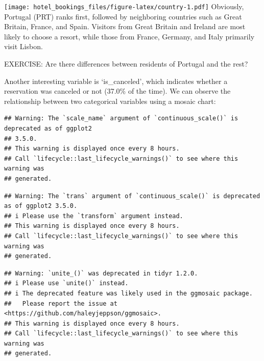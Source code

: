 \documentclass[
]{article}
\newenvironment{Shaded}{\begin{snugshade}}{\end{snugshade}}
\newcommand{\AttributeTok}[1]{\textcolor[rgb]{0.13,0.29,0.53}{#1}}
\newcommand{\CommentTok}[1]{\textcolor[rgb]{0.56,0.35,0.01}{\textit{#1}}}
\newcommand{\FunctionTok}[1]{\textcolor[rgb]{0.13,0.29,0.53}{\textbf{#1}}}
\newcommand{\NormalTok}[1]{#1}
\newcommand{\OtherTok}[1]{\textcolor[rgb]{0.56,0.35,0.01}{#1}}
\newcommand{\SpecialCharTok}[1]{\textcolor[rgb]{0.81,0.36,0.00}{\textbf{#1}}}
\begin{document}
\texttt{[image: hotel\_bookings\_files/figure-latex/country-1.pdf]}
Obviously, Portugal (PRT) ranks first, followed by neighboring countries
such as Great Britain, France, and Spain. Visitors from Great Britain
and Ireland are most likely to choose a resort, while those from France,
Germany, and Italy primarily visit Lisbon.

EXERCISE: Are there differences between residents of Portugal and the
rest?

Another interesting variable is `is\_canceled', which indicates whether
a reservation was canceled or not (37.0\% of the time). We can observe
the relationship between two categorical variables using a mosaic chart:

\begin{Shaded}
\end{Shaded}

\begin{verbatim}
## Warning: The `scale_name` argument of `continuous_scale()` is deprecated as of ggplot2
## 3.5.0.
## This warning is displayed once every 8 hours.
## Call `lifecycle::last_lifecycle_warnings()` to see where this warning was
## generated.
\end{verbatim}

\begin{verbatim}
## Warning: The `trans` argument of `continuous_scale()` is deprecated as of ggplot2 3.5.0.
## i Please use the `transform` argument instead.
## This warning is displayed once every 8 hours.
## Call `lifecycle::last_lifecycle_warnings()` to see where this warning was
## generated.
\end{verbatim}

\begin{verbatim}
## Warning: `unite_()` was deprecated in tidyr 1.2.0.
## i Please use `unite()` instead.
## i The deprecated feature was likely used in the ggmosaic package.
##   Please report the issue at <https://github.com/haleyjeppson/ggmosaic>.
## This warning is displayed once every 8 hours.
## Call `lifecycle::last_lifecycle_warnings()` to see where this warning was
## generated.
\end{verbatim}
\end{document}
